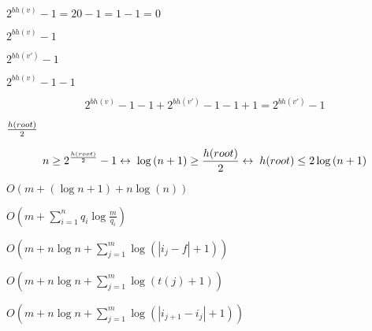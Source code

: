 \documentclass{article}
\begin{document}
$2^{bh(v)} - 1 = 20 - 1 = 1 - 1 = 0$
\pagebreak

$2^{bh(v)} - 1$
\pagebreak

$2^{bh(v')} - 1$
\pagebreak

$2^{bh(v)} - 1 - 1$
\pagebreak

\[2^{bh(v)} - 1 - 1 + 2^{bh(v')} - 1 - 1 + 1 = 2^{bh(v')} - 1\]
\pagebreak

$h(root) \over 2$
\pagebreak

\[n \geq 2^{{h(root) \over 2}} - 1 \leftrightarrow \; \log{(n+1)} \geq {h(root) \over 2} \leftrightarrow \; h(root) \leq 2\log{(n+1)}\]
\pagebreak

$O\left(m + (\log n + 1) + n\log(n) \right)$
\pagebreak

$O\left(m+\sum_{i=1}^n q_i\log\frac{m}{q_i}\right)$
\pagebreak

$O\left(m+n\log n+\sum_{j=1}^m \log(|i_j-f|+1) \right)$
\pagebreak

$O\left(m+n\log n+\sum_{j=1}^m \log(t(j)+1) \right)$
\pagebreak

$O\left(m+n\log n+\sum_{j=1}^m \log(|i_{j+1}-i_j|+1) \right)$
\pagebreak
\end{document}

